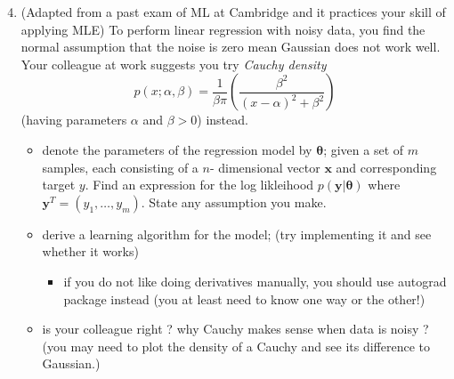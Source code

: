 \documentclass[ignorenonframetext,aspectratio=169]{beamer}
\providecommand{\tightlist}{%
  \setlength{\itemsep}{0pt}\setlength{\parskip}{0pt}}
\newcommand{\vv}[1]{\boldsymbol{#1}}
\begin{document}
\begin{frame}{}
\protect\hypertarget{section-2}{}

\footnotesize

\begin{enumerate}
\setcounter{enumi}{3}
\item
  (Adapted from a past exam of ML at Cambridge and it practices your
  skill of applying MLE) To perform linear regression with noisy data,
  you find the normal assumption that the noise is zero mean Gaussian
  does not work well. Your colleague at work suggests you try
  \textit{Cauchy density}
  \[p(x; \alpha, \beta) = \frac{1}{\beta\pi} \left(\frac{\beta^2}{(x-\alpha)^2+\beta^2}\right)\]
  (having parameters \(\alpha\) and \(\beta>0\)) instead.

  \begin{itemize}
  \tightlist
  \item
    denote the parameters of the regression model by \(\vv{\theta}\);
    given a set of \(m\) samples, each consisting of a \(n\)-
    dimensional vector \(\vv{x}\) and corresponding target \(y\). Find
    an expression for the log likleihood \(p(\vv{y}|\vv{\theta})\) where
    \(\vv{y}^T=(y_1,\ldots, y_m)\). State any assumption you make.
  \item
    derive a learning algorithm for the model; (try implementing it and
    see whether it works)

    \begin{itemize}
    \tightlist
    \item
      if you do not like doing derivatives manually, you should use
      autograd package instead (you at least need to know one way or the
      other!)
    \end{itemize}
  \item
    is your colleague right ? why Cauchy makes sense when data is noisy
    ? (you may need to plot the density of a Cauchy and see its
    difference to Gaussian.)
  \end{itemize}
\end{enumerate}

\end{frame}
\end{document}
